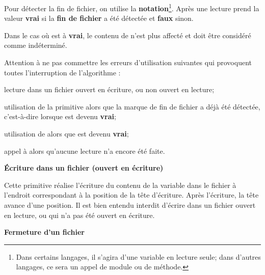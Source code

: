 Pour détecter la fin de fichier, on utilise la
\textbf{notation}\footnote{Dans certains langages, il
s'agira d'une variable en lecture
seule; dans d'autres langages, ce sera un appel de
module ou de méthode.}.
Après une lecture  prend la valeur
\textbf{vrai} si la \textbf{fin de fichier} a été détectée et
\textbf{faux} sinon.

Dans le cas où  est à
\textbf{vrai}, le contenu de 
 n’est plus affecté et doit être
considéré comme indéterminé.

Attention à ne pas commettre les erreurs d’utilisation suivantes qui
provoquent toutes l’interruption de l’algorithme :

\begin{liste}
	\item 
		lecture dans un fichier ouvert en écriture, ou non ouvert en lecture;
	\item 
		utilisation de la primitive  alors que la marque de
		fin de fichier a déjà été détectée, c’est-à-dire lorsque
		 est devenu \textbf{vrai};
	\item 
		utilisation de  alors que
		 est devenu \textbf{vrai};
	\item 
		appel à  alors
		qu'aucune lecture n'a encore été faite.
\end{liste}

{\sffamily\bfseries
Écriture dans un fichier (ouvert en écriture) }


Cette primitive réalise l’écriture du contenu de la variable
 dans le fichier
 à l’endroit correspondant à la position
de la tête d’écriture. Après l’écriture, la tête avance d’une position.
Il est bien entendu interdit d’écrire dans un fichier ouvert en
lecture, ou qui n’a pas été ouvert en écriture. 

{\sffamily\bfseries\upshape
Fermeture d’un fichier }


